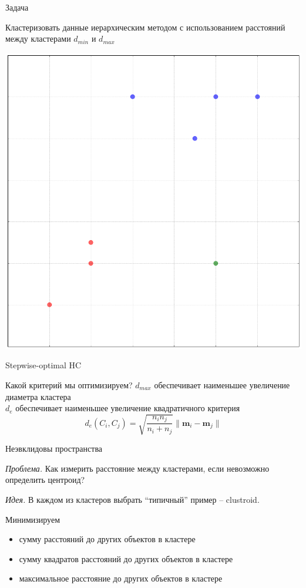 \documentclass[aspectratio=169]{beamer}
\begin{document}
\begin{frame}{Задача}

Кластеризовать данные иерархическим методом с использованием расстояний между кластерами $d_{min}$ и $d_{max}$
\begin{center}
\includegraphics[height=0.7\textheight]{images/toy.png}
\end{center}

\end{frame}

\begin{frame}{Stepwise-optimal HC}

Какой критерий мы оптимизируем?
\swo
$d_{max}$ обеспечивает наименьшее увеличение диаметра кластера \\
$d_e$ обеспечивает наименьшее увеличение квадратичного критерия
\[
d_e(C_i, C_j) = \sqrt{\frac{n_i n_j}{n_i + n_j}} \|\mathbf{m}_i -\mathbf{m}_j \|
\]

\end{frame}

\begin{frame}{Неэвклидовы пространства}

{\it Проблема. } Как измерить расстояние между кластерами, если невозможно определить центроид?

\vspace{1em}
{\it Идея. } В каждом из кластеров выбрать ``типичный'' пример -- clustroid.

\vspace{1em}
Минимизируем
\begin{itemize}
\item сумму расстояний до других объектов в кластере
\item сумму квадратов расстояний до других объектов в кластере
\item максимальное расстояние до других объектов в кластере
\end{itemize}

\end{frame}
\end{document}
